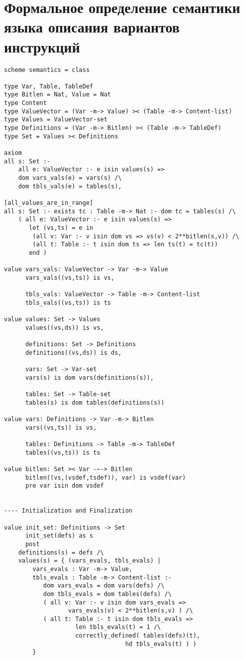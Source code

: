\chapter{Формальное определение семантики языка описания вариантов инструкций}\label{sec:semantics}

\begin{lstlisting}
scheme semantics = class

type Var, Table, TableDef
type Bitlen = Nat, Value = Nat
type Content
type ValueVector = (Var -m-> Value) >< (Table -m-> Content-list)
type Values = ValueVector-set
type Definitions = (Var -m-> Bitlen) >< (Table -m-> TableDef)
type Set = Values >< Definitions

axiom
all s: Set :-
    all e: ValueVector :- e isin values(s) =>
	dom vars_vals(e) = vars(s) /\
	dom tbls_vals(e) = tables(s),

[all_values_are_in_range]
all s: Set :- exists tc : Table -m-> Nat :- dom tc = tables(s) /\
    ( all e: ValueVector :- e isin values(s) =>
       let (vs,ts) = e in
        (all v: Var :- v isin dom vs => vs(v) < 2**bitlen(s,v)) /\
        (all t: Table :- t isin dom ts => len ts(t) = tc(t))
       end )

value vars_vals: ValueVector -> Var -m-> Value
      vars_vals((vs,ts)) is vs,

      tbls_vals: ValueVector -> Table -m-> Content-list
      tbls_vals((vs,ts)) is ts

value values: Set -> Values
      values((vs,ds)) is vs,

      definitions: Set -> Definitions
      definitions((vs,ds)) is ds,

      vars: Set -> Var-set
      vars(s) is dom vars(definitions(s)),

      tables: Set -> Table-set
      tables(s) is dom tables(definitions(s))

value vars: Definitions -> Var -m-> Bitlen
      vars((vs,ts)) is vs,

      tables: Definitions -> Table -m-> TableDef
      tables((vs,ts)) is ts

value bitlen: Set >< Var -~-> Bitlen
      bitlen((vs,(vsdef,tsdef)), var) is vsdef(var)
      pre var isin dom vsdef


---- Initialization and Finalization

value init_set: Definitions -> Set
      init_set(defs) as s
      post
	definitions(s) = defs /\
	values(s) = { (vars_evals, tbls_evals) |
		vars_evals : Var -m-> Value,
        tbls_evals : Table -m-> Content-list :-
		   dom vars_evals = dom vars(defs) /\
		   dom tbls_evals = dom tables(defs) /\
		   ( all v: Var :- v isin dom vars_evals =>
                  vars_evals(v) < 2**bitlen(s,v) ) /\
		   ( all t: Table :- t isin dom tbls_evals =>
                    len tbls_evals(t) = 1 /\
                    correctly_defined( tables(defs)(t),
                                  hd tbls_evals(t) ) )
		}



\end{lstlisting}
